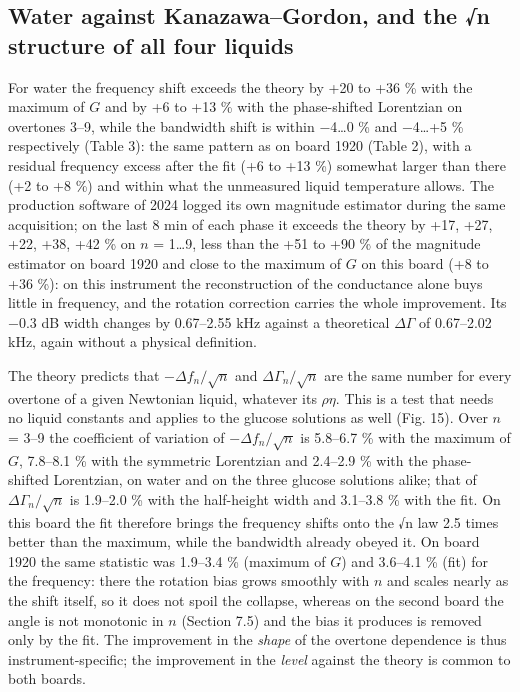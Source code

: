 \documentclass[11pt,a4paper]{article}
\begin{document}
\hypertarget{water-against-kanazawagordon-and-the-n-structure-of-all-four-liquids}{%
\subsection{Water against Kanazawa--Gordon, and the √n structure of
all four
liquids}\label{water-against-kanazawagordon-and-the-n-structure-of-all-four-liquids}}

For water the frequency shift exceeds the theory by +20 to +36 \% with
the maximum of \(G\) and by +6 to +13 \% with the phase-shifted
Lorentzian on overtones 3--9, while the bandwidth shift is within
−4\ldots0 \% and −4\ldots+5 \% respectively (Table 3): the same pattern
as on board 1920 (Table 2), with a residual frequency excess after the
fit (+6 to +13 \%) somewhat larger than there (+2 to +8 \%) and within
what the unmeasured liquid temperature allows. The production software
of 2024 logged its own magnitude estimator during the same acquisition;
on the last 8 min of each phase it exceeds the theory by +17, +27, +22,
+38, +42 \% on \(n\) = 1\ldots9, less than the +51 to +90 \% of the
magnitude estimator on board 1920 and close to the maximum of \(G\) on
this board (+8 to +36 \%): on this instrument the reconstruction of the
conductance alone buys little in frequency, and the rotation correction
carries the whole improvement. Its −0.3 dB width changes by 0.67--2.55
kHz against a theoretical \(\Delta\Gamma\) of 0.67--2.02 kHz, again
without a physical definition.

The theory predicts that \(-\Delta f_n/\sqrt n\) and
\(\Delta\Gamma_n/\sqrt n\) are the same number for every overtone of a
given Newtonian liquid, whatever its \(\rho\eta\). This is a test that
needs no liquid constants and applies to the glucose solutions as well
(Fig. 15). Over \(n\) = 3--9 the coefficient of variation of
\(-\Delta f_n/\sqrt n\) is 5.8--6.7 \% with the maximum of \(G\),
7.8--8.1 \% with the symmetric Lorentzian and 2.4--2.9 \% with the
phase-shifted Lorentzian, on water and on the three glucose solutions
alike; that of \(\Delta\Gamma_n/\sqrt n\) is 1.9--2.0 \% with the
half-height width and 3.1--3.8 \% with the fit. On this board the fit
therefore brings the frequency shifts onto the √n law 2.5 times better
than the maximum, while the bandwidth already obeyed it. On board 1920
the same statistic was 1.9--3.4 \% (maximum of \(G\)) and 3.6--4.1 \%
(fit) for the frequency: there the rotation bias grows smoothly with
\(n\) and scales nearly as the shift itself, so it does not spoil the
collapse, whereas on the second board the angle is not monotonic in
\(n\) (Section 7.5) and the bias it produces is removed only by the fit.
The improvement in the \emph{shape} of the overtone dependence is thus
instrument-specific; the improvement in the \emph{level} against the
theory is common to both boards.
\end{document}
